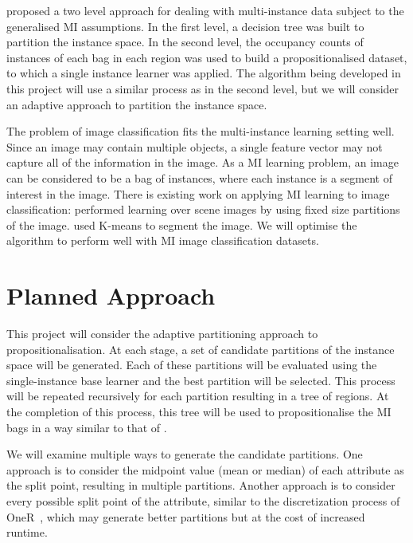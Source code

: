 \documentclass[a4paper,12pt]{article} %
\begin{document}
 proposed a two level approach for dealing with multi-instance data subject to the generalised MI assumptions. In the first level, a decision tree was built to partition the instance space. In the second level, the occupancy counts of instances of each bag in each region was used to build a propositionalised dataset, to which a single instance learner was applied.
The algorithm being developed in this project will use a similar process as  in the second level, but we will consider an adaptive approach to partition the instance space.

The problem of image classification fits the multi-instance learning setting well. Since an image may contain multiple objects, a single feature vector may not capture all of the information in the image. As a MI learning problem, an image can be considered to be a bag of instances, where each instance is a segment of interest in the image. There is existing work on applying MI learning to image classification:  performed learning over scene images by using fixed size partitions of the image.  used K-means to segment the image. We will optimise the algorithm to perform well with MI image classification datasets.


\section{Planned Approach}

This project will consider the adaptive partitioning approach to propositionalisation.
At each stage, a set of candidate partitions of the instance space will be generated. Each of these partitions will be evaluated using the  single-instance base learner and the best partition will be selected. This process will be repeated recursively for each partition resulting in a tree of regions. At the completion of this process, this tree will be used to propositionalise the MI bags in a way similar to that of .

We will examine multiple ways to generate the candidate partitions. One approach is to consider the midpoint value (mean or median) of each attribute as the split point, resulting in multiple partitions. Another approach is to consider every possible split point of the attribute, similar to the discretization process of OneR~\cite{holte}, which may generate better partitions but at the cost of increased runtime.
\end{document}
